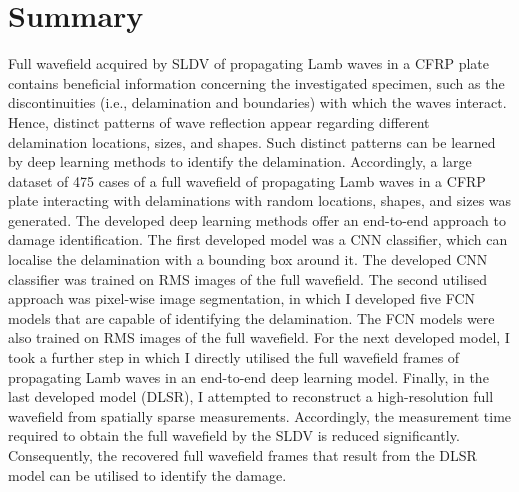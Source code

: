 \section{Summary}
\label{sec46}
Full wavefield acquired by SLDV of propagating Lamb waves in a CFRP plate contains beneficial information concerning the investigated specimen, such as the discontinuities (i.e., delamination and boundaries) with which the waves interact.
Hence, distinct patterns of wave reflection appear regarding different delamination locations, sizes, and shapes.
Such distinct patterns can be learned by deep learning methods to identify the delamination.
Accordingly, a large dataset of 475 cases of a full wavefield of propagating Lamb waves in a CFRP plate interacting with delaminations with random locations, shapes, and sizes was generated.
The developed deep learning methods offer an end-to-end approach to damage identification.
The first developed model was a CNN classifier, which can localise the delamination with a bounding box around it.
The developed CNN classifier was trained on RMS images of the full wavefield.
The second utilised approach was pixel-wise image segmentation, in which I developed five FCN models that are capable of identifying the delamination.
The FCN models were also trained on RMS images of the full wavefield.
For the next developed model, I took a further step in which I directly utilised the full wavefield frames of propagating Lamb waves in an end-to-end deep learning model. 
Finally, in the last developed model (DLSR), I attempted to reconstruct a high-resolution full wavefield from spatially sparse measurements.
Accordingly, the measurement time required to obtain the full wavefield by the SLDV is reduced significantly.
Consequently, the recovered full wavefield frames that result from the DLSR model can be utilised to identify the damage.